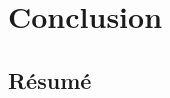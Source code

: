 \documentclass[11pt,french,ignorenonframetext,]{beamer}
\begin{document}











\section{\hfill{}Conclusion\hfill{}}
\subsection{Résumé}
\end{document}
